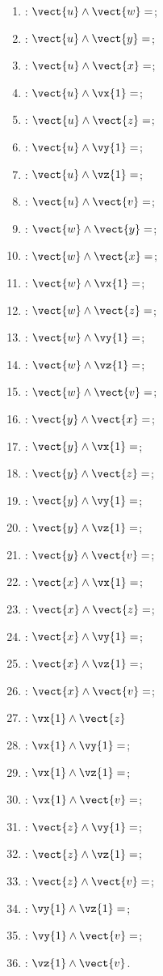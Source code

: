     
\begin{multicols}{2}
\begin{enumerate}
\item : $\vect{u}\wedge\vect{w} =$;
\item : $\vect{u}\wedge\vect{y} =$;
\item : $\vect{u}\wedge\vect{x} =$;
\item : $\vect{u}\wedge\vx{1} =$;
\item : $\vect{u}\wedge\vect{z} =$;
\item : $\vect{u}\wedge\vy{1} =$;
\item : $\vect{u}\wedge\vz{1} =$;
\item : $\vect{u}\wedge\vect{v} =$;
\item : $\vect{w}\wedge\vect{y} =$;
\item : $\vect{w}\wedge\vect{x} =$;
\item : $\vect{w}\wedge\vx{1} =$;
\item : $\vect{w}\wedge\vect{z} =$;
\item : $\vect{w}\wedge\vy{1} =$;
\item : $\vect{w}\wedge\vz{1} =$;
\item : $\vect{w}\wedge\vect{v} =$;
\item : $\vect{y}\wedge\vect{x} =$;
\item : $\vect{y}\wedge\vx{1} =$;
\item : $\vect{y}\wedge\vect{z} =$;
\item : $\vect{y}\wedge\vy{1} =$;
\item : $\vect{y}\wedge\vz{1} =$;
\item : $\vect{y}\wedge\vect{v} =$;
\item : $\vect{x}\wedge\vx{1} =$;
\item : $\vect{x}\wedge\vect{z} =$;
\item : $\vect{x}\wedge\vy{1} =$;
\item : $\vect{x}\wedge\vz{1} =$;
\item : $\vect{x}\wedge\vect{v} =$;
\item : $\vx{1}\wedge\vect{z}$
\item : $\vx{1}\wedge\vy{1} =$;
\item : $\vx{1}\wedge\vz{1} =$;
\item : $\vx{1}\wedge\vect{v} =$;
\item : $\vect{z}\wedge\vy{1} =$;
\item : $\vect{z}\wedge\vz{1} =$;
\item : $\vect{z}\wedge\vect{v} =$;
\item : $\vy{1}\wedge\vz{1} =$;
\item : $\vy{1}\wedge\vect{v} =$;
\item : $\vz{1}\wedge\vect{v}$.
\end{enumerate}
\end{multicols}

